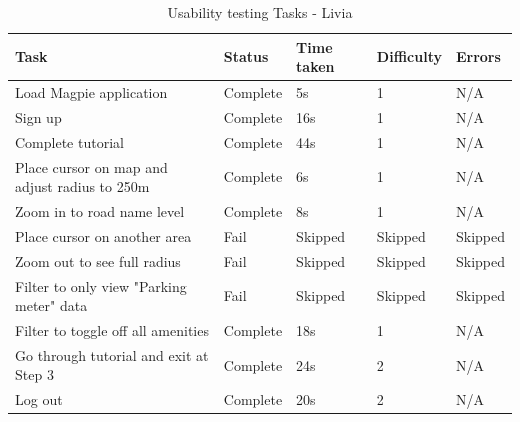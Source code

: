 \begin{table}[h!]
  \centering
  \caption{Usability testing Tasks - Livia}
  \begin{tabular}{|p{}|p{}|p{}|p{}|p{}|}
    \hline
    \textbf{Task}                                 & \textbf{Status} & \textbf{Time taken} & \textbf{Difficulty} & \textbf{Errors} \\
    \hline
    Load Magpie application                       & Complete        & 5s                  & 1                   & N/A             \\
    \hline
    Sign up                                       & Complete        & 16s                 & 1                   & N/A             \\
    \hline
    Complete tutorial                             & Complete        & 44s                 & 1                   & N/A             \\
    \hline
    Place cursor on map and adjust radius to 250m & Complete        & 6s                  & 1                   & N/A             \\
    \hline
    Zoom in to road name level                    & Complete        & 8s                  & 1                   & N/A             \\
    \hline
    Place cursor on another area                  & Fail            & Skipped             & Skipped             & Skipped         \\
    \hline
    Zoom out to see full radius                   & Fail            & Skipped             & Skipped             & Skipped         \\
    \hline
    Filter to only view "Parking meter" data      & Fail            & Skipped             & Skipped             & Skipped         \\
    \hline
    Filter to toggle off all amenities            & Complete        & 18s                 & 1                   & N/A             \\
    \hline
    Go through tutorial and exit at Step 3        & Complete        & 24s                 & 2                   & N/A             \\
    \hline
    Log out                                       & Complete        & 20s                 & 2                   & N/A             \\
    \hline
  \end{tabular}
\end{table}

